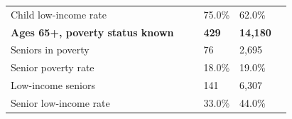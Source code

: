 \documentclass[9pt]{report}
\begin{document}
\begin{tabular}{p{.10in}p{.10in}p{.10in}p{3.7in}>{\hfill}p{.85in}>{\hfill}p{.85in}>{\hfill}p{.85in}>{\hfill}p{.85in}p{0.1in}}
\multicolumn{4}{l}{\parbox{3.6in}{\strut\raggedright{{Child low-income rate}}\strut}} &  &  & 75.0\% & 62.0\% & \multicolumn{1}{l}{}  \\ 
\multicolumn{4}{l}{\parbox{3.5in}{\strut\raggedright{\textbf{Ages 65+, poverty status known}\strut}}} & \textbf{} & \textbf{} & \textbf{429} & \textbf{14,180} & \textbf{} \\ 
\multicolumn{4}{l}{\parbox{3.6in}{\strut\raggedright{{Seniors in poverty}}\strut}} &  &  & 76 & 2,695 & \multicolumn{1}{l}{}  \\ 
\multicolumn{4}{l}{\parbox{3.6in}{\strut\raggedright{{Senior poverty rate}}\strut}} &  &  & 18.0\% & 19.0\% & \multicolumn{1}{l}{}  \\ 
\multicolumn{4}{l}{\parbox{3.6in}{\strut\raggedright{{Low-income seniors}}\strut}} &  &  & 141 & 6,307 & \multicolumn{1}{l}{}  \\ 
\multicolumn{4}{l}{\parbox{3.6in}{\strut\raggedright{{Senior low-income rate}}\strut}} &  &  & 33.0\% & 44.0\% & \multicolumn{1}{l}{}  \\ 

\end{tabular}
\setlength{\tabcolsep}{6pt} %
\end{document}
